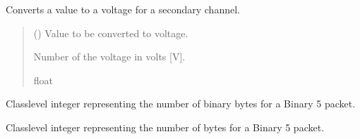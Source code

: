 \documentclass[letterpaper,10pt,english]{sphinxmanual}
\begin{document}
\begin{fulllineitems}
\begin{fulllineitems}
\label{\detokenize{PodDevice_8401HR:PodDevice_8401HR.POD_8401HR._Voltage_SecondaryChannels}}
\pysigstartsignatures
{}
\pysigstopsignatures
\sphinxAtStartPar
Converts a value to a voltage for a secondary channel.
\begin{quote}\begin{description}
\sphinxAtStartPar
{} () \textendash{} Value to be converted to voltage.

\sphinxAtStartPar
Number of the voltage in volts {[}V{]}.

\sphinxAtStartPar
float

\end{description}\end{quote}

\end{fulllineitems}


\begin{fulllineitems}
\label{\detokenize{PodDevice_8401HR:PodDevice_8401HR.POD_8401HR.__B5BINARYLENGTH}}
\pysigstartsignatures
{}
\pysigstopsignatures
\sphinxAtStartPar
Class\sphinxhyphen{}level integer representing the number of binary bytes for a     Binary 5 packet.

\end{fulllineitems}


\begin{fulllineitems}
\label{\detokenize{PodDevice_8401HR:PodDevice_8401HR.POD_8401HR.__B5LENGTH}}
\pysigstartsignatures
{}
\pysigstopsignatures
\sphinxAtStartPar
Class\sphinxhyphen{}level integer representing the number of bytes for a Binary 5 packet.


\end{fulllineitems}
\end{fulllineitems}
\end{document}
